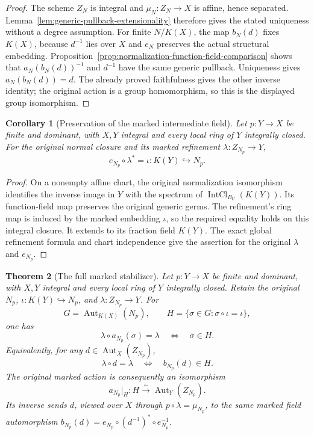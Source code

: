 \documentclass[11pt]{article}
\newtheorem{theorem}{Theorem}[section]
\newtheorem{corollary}[theorem]{Corollary}
\theoremstyle{definition}
\theoremstyle{remark}
\begin{document}
\begin{proof}
The scheme \(Z_N\) is integral and \(\mu_N:Z_N\to X\) is affine,
hence separated. Lemma~\ref{lem:generic-pullback-extensionality}
therefore gives the stated uniqueness without a degree assumption.
For finite \(N/K(X)\), the map \(b_N(d)\) fixes \(K(X)\), because
\(d^{-1}\) lies over \(X\) and \(e_N\) preserves the actual
structural embedding. Proposition~\ref{prop:normalization-function-field-comparison}
shows that \(a_N(b_N(d))^{-1}\) and \(d^{-1}\) have the same generic
pullback. Uniqueness gives \(a_N(b_N(d))=d\). The already proved
faithfulness gives the other inverse identity; the original action
is a group homomorphism, so this is the displayed group isomorphism.
\end{proof}

\begin{corollary}[Preservation of the marked intermediate field]
\label{cor:normalization-marked-function-field}
Let \(p:Y\to X\) be finite and dominant, with \(X,Y\) integral and
every local ring of \(Y\) integrally closed. For the original normal
closure and its marked refinement \(\lambda:Z_{N_p}\to Y\),
\[
 e_{N_p}\circ\lambda^*=\iota:K(Y)\hookrightarrow N_p.
\]
\end{corollary}

\begin{proof}
On a nonempty affine chart, the original normalization isomorphism
identifies the inverse image in \(Y\) with the spectrum of
\(\operatorname{IntCl}_{B_U}(K(Y))\). Its function-field map preserves
the original generic germs. The refinement's ring map is induced by
the marked embedding \(\iota\), so the required equality holds on
this integral closure. It extends to its fraction field \(K(Y)\).
The exact global refinement formula and chart independence give the
assertion for the original \(\lambda\) and \(e_{N_p}\).
\end{proof}

\begin{theorem}[The full marked stabilizer]
\label{thm:normalization-marked-stabilizer}
Let \(p:Y\to X\) be finite and dominant, with \(X,Y\) integral and
every local ring of \(Y\) integrally closed. Retain the original
\(N_p\), \(\iota:K(Y)\hookrightarrow N_p\), and
\(\lambda:Z_{N_p}\to Y\). For
\[
 G=\operatorname{Aut}_{K(X)}(N_p),\qquad
 H=\{\sigma\in G:\sigma\circ\iota=\iota\},
\]
one has
\[
 \lambda\circ a_{N_p}(\sigma)=\lambda
 \quad\Longleftrightarrow\quad \sigma\in H.
\]
Equivalently, for any \(d\in\operatorname{Aut}_X(Z_{N_p})\),
\[
 \lambda\circ d=\lambda
 \quad\Longleftrightarrow\quad b_{N_p}(d)\in H.
\]
The original marked action is consequently an isomorphism
\[
 a_{N_p}|_H:H\xrightarrow{\sim}\operatorname{Aut}_Y(Z_{N_p}).
\]
Its inverse sends \(d\), viewed over \(X\) through
\(p\circ\lambda=\mu_{N_p}\), to the same marked field automorphism
\(b_{N_p}(d)=e_{N_p}\circ(d^{-1})^*\circ e_{N_p}^{-1}\).
\end{theorem}
\end{document}
